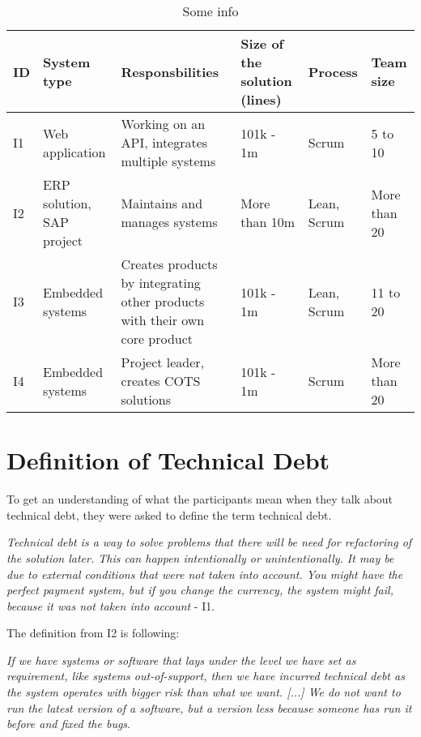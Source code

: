 \begin{table}[ht!]
	\centering
    \begin{tabular}{|p{0.5cm}|p{2.5cm}|p{3.5cm}|p{2cm}|p{2cm}|p{2cm}|}
    \hline
    \textbf{ID} & \textbf{System type} & \textbf{Responsbilities} & \textbf{Size of the solution (lines)} & \textbf{Process} & \textbf{Team size}\\ \hline
    I1 & Web application & Working on an API, integrates multiple systems & 101k - 1m & Scrum & 5 to 10 \\ \hline
    I2 & ERP solution, SAP project & Maintains and manages systems & More than 10m & Lean, Scrum & More than 20 \\ \hline
    I3 & Embedded systems & Creates products by integrating other products with their own core product & 101k - 1m & Lean, Scrum & 11 to 20\\ \hline
    I4 & Embedded systems & Project leader, creates COTS solutions & 101k - 1m & Scrum & More than 20 \\ \hline
    \end{tabular}
    \caption{Some info} \label{tab:participantsResponsbilities}
\end{table}







\section{Definition of Technical Debt}
\label{sec:techDebt}
To get an understanding of what the participants mean when they talk about technical debt, they were asked to define the term technical debt.
\begin{displayquote}
\textit{Technical debt is a way to solve problems that there will be need for refactoring of the solution later. This can happen intentionally or unintentionally. It may be due to external conditions that were not taken into account. You might have the perfect payment system, but if you change the currency, the system might fail, because it was not taken into account} - I1.  
\end{displayquote}

The definition from I2 is following:
\begin{displayquote}
\textit{If we have systems or software that lays under the level we have set as requirement, like systems out-of-support, then we have incurred technical debt as the system operates with bigger risk than what we want. [...] We do not want to run the latest version of a software, but a version less because someone has run it before and fixed the bugs}.
\end{displayquote}

